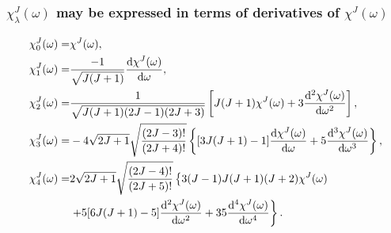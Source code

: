 \subsubsection{ $\chi_{\lambda}^{J}(\omega)$ may be expressed in terms of derivatives of $\chi^{J}(\omega)$}
\begin{align}
\chi_{0}^{J}(\omega)= & \chi^{J}(\omega) , \notag\\
\chi_{1}^{J}(\omega)= & \frac{-1}{\sqrt{J(J+1)}} \frac{\mathrm{d} \chi^{J}(\omega)}{\mathrm{d} \omega} , \notag\\
\chi_{2}^{J}(\omega)= & \frac{1}{\sqrt{J(J+1)(2 J-1)(2 J+3)}}\left[J(J+1) \chi^{J}(\omega)+3 \frac{\mathrm{d}^{2} \chi^{J}(\omega)}{\mathrm{d} \omega^{2}}\right]  ,\notag\\
\chi_{3}^{J}(\omega)= & -4 \sqrt{2 J+1} \sqrt{\frac{(2 J-3)!}{(2 J+4)!}}\left\{[3 J(J+1)-1] \frac{\mathrm{d} \chi^{J}(\omega)}{\mathrm{d} \omega}+5 \frac{\mathrm{d}^{3} \chi^{J}(\omega)}{\mathrm{d} \omega^{3}}\right\} , \label{eq:4:15:52}\\
\chi_{4}^{J}(\omega)= & 2 \sqrt{2 J+1} \sqrt{\frac{(2 J-4)!}{(2 J+5)!}}\left\{3(J-1) J(J+1)(J+2) \chi^{J}(\omega)\right.  \notag\\
& \left.+5[6 J(J+1)-5] \frac{\mathrm{d}^{2} \chi^{J}(\omega)}{\mathrm{d} \omega^{2}}+35 \frac{\mathrm{d}^{4} \chi^{J}(\omega)}{\mathrm{d} \omega^{4}}\right\} . \notag
\end{align}
